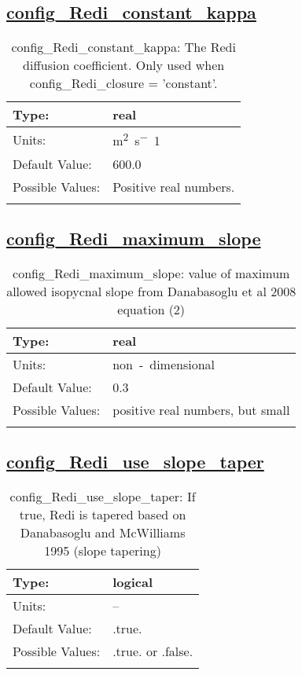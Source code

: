 \subsection[config\_Redi\_constant\_kappa]{\hyperref[sec:nm_tab_Redi_isopycnal_mixing]{config\_Redi\_constant\_kappa}}
\label{subsec:nm_sec_config_Redi_constant_kappa}
\begin{center}
\begin{longtable}{| p{2.0in} || p{4.0in} |}
    \hline
    Type: & real \\
    \hline
    Units: & \si{m^2.s^-1} \\
    \hline
    Default Value: & 600.0 \\
    \hline
    Possible Values: & Positive real numbers. \\
    \hline
    \caption{config\_Redi\_constant\_kappa: The Redi diffusion coefficient. Only used when config\_Redi\_closure = 'constant'.}
\end{longtable}
\end{center}
\subsection[config\_Redi\_maximum\_slope]{\hyperref[sec:nm_tab_Redi_isopycnal_mixing]{config\_Redi\_maximum\_slope}}
\label{subsec:nm_sec_config_Redi_maximum_slope}
\begin{center}
\begin{longtable}{| p{2.0in} || p{4.0in} |}
    \hline
    Type: & real \\
    \hline
    Units: & \si{non-dimensional} \\
    \hline
    Default Value: & 0.3 \\
    \hline
    Possible Values: & positive real numbers, but small \\
    \hline
    \caption{config\_Redi\_maximum\_slope: value of maximum allowed isopycnal slope from Danabasoglu et al 2008 equation (2)}
\end{longtable}
\end{center}
\subsection[config\_Redi\_use\_slope\_taper]{\hyperref[sec:nm_tab_Redi_isopycnal_mixing]{config\_Redi\_use\_slope\_taper}}
\label{subsec:nm_sec_config_Redi_use_slope_taper}
\begin{center}
\begin{longtable}{| p{2.0in} || p{4.0in} |}
    \hline
    Type: & logical \\
    \hline
    Units: & -- \\
    \hline
    Default Value: & .true. \\
    \hline
    Possible Values: & .true. or .false. \\
    \hline
    \caption{config\_Redi\_use\_slope\_taper: If true, Redi is tapered based on Danabasoglu and McWilliams 1995 (slope tapering)}
\end{longtable}
\end{center}
